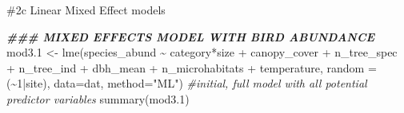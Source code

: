\documentclass[
]{article}
\newenvironment{Shaded}{\begin{snugshade}}{\end{snugshade}}
\newcommand{\AttributeTok}[1]{\textcolor[rgb]{0.77,0.63,0.00}{#1}}
\newcommand{\CommentTok}[1]{\textcolor[rgb]{0.56,0.35,0.01}{\textit{#1}}}
\newcommand{\DecValTok}[1]{\textcolor[rgb]{0.00,0.00,0.81}{#1}}
\newcommand{\DocumentationTok}[1]{\textcolor[rgb]{0.56,0.35,0.01}{\textbf{\textit{#1}}}}
\newcommand{\FloatTok}[1]{\textcolor[rgb]{0.00,0.00,0.81}{#1}}
\newcommand{\FunctionTok}[1]{\textcolor[rgb]{0.00,0.00,0.00}{#1}}
\newcommand{\NormalTok}[1]{#1}
\newcommand{\OtherTok}[1]{\textcolor[rgb]{0.56,0.35,0.01}{#1}}
\newcommand{\SpecialCharTok}[1]{\textcolor[rgb]{0.00,0.00,0.00}{#1}}
\newcommand{\StringTok}[1]{\textcolor[rgb]{0.31,0.60,0.02}{#1}}
\begin{document}
\#2c Linear Mixed Effect models

\begin{Shaded}
\begin{Highlighting}[]
\DocumentationTok{\#\#\# MIXED EFFECTS MODEL WITH BIRD ABUNDANCE}
\NormalTok{mod3}\FloatTok{.1} \OtherTok{\textless{}{-}} \FunctionTok{lme}\NormalTok{(species\_abund }\SpecialCharTok{\textasciitilde{}}\NormalTok{ category}\SpecialCharTok{*}\NormalTok{size }\SpecialCharTok{+}\NormalTok{ canopy\_cover }\SpecialCharTok{+}\NormalTok{ n\_tree\_spec }\SpecialCharTok{+}\NormalTok{ n\_tree\_ind }\SpecialCharTok{+}\NormalTok{ dbh\_mean }\SpecialCharTok{+}\NormalTok{ n\_microhabitats }\SpecialCharTok{+}\NormalTok{ temperature, }\AttributeTok{random =}\NormalTok{ (}\SpecialCharTok{\textasciitilde{}}\DecValTok{1}\SpecialCharTok{|}\NormalTok{site), }\AttributeTok{data=}\NormalTok{dat, }\AttributeTok{method=}\StringTok{"ML"}\NormalTok{) }\CommentTok{\#initial, full model with all potential predictor variables}
\FunctionTok{summary}\NormalTok{(mod3}\FloatTok{.1}\NormalTok{)}
\end{Highlighting}
\end{Shaded}
\end{document}
